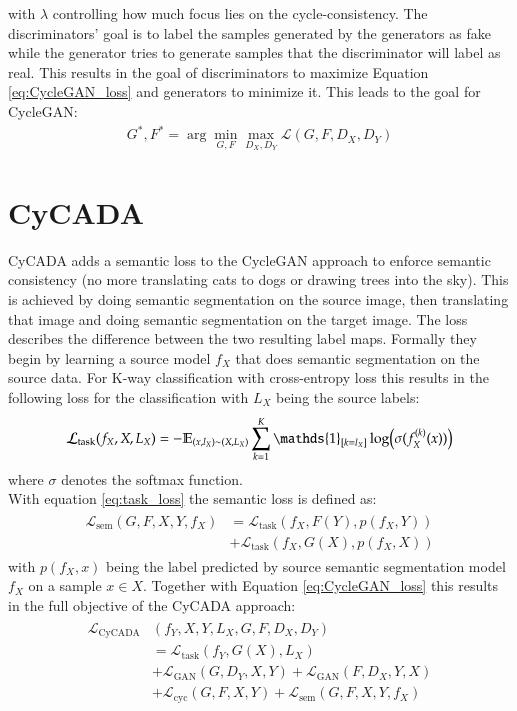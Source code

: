with $\lambda$ controlling how much focus lies on the cycle-consistency. The discriminators' goal is to label the samples generated by the generators as fake while the generator tries to generate samples that the discriminator will label as real. This results in the goal of discriminators to maximize Equation \ref{eq:CycleGAN_loss} and generators to minimize it. This leads to the goal for CycleGAN: 
\begin{align}
	G^*, F^* = \arg \underset{G,F}{\min}\underset{D_X, D_Y}{\max} \mathcal{L}(G,F,D_X,D_Y) \label{eq:GAN_goal}
\end{align}
\section{CyCADA} 
CyCADA \cite{DBLP:journals/corr/abs-1711-03213} adds a semantic loss to the CycleGAN approach to enforce semantic consistency (no more translating cats to dogs or drawing trees into the sky). This is achieved by doing semantic segmentation on the source image, then translating that image and doing semantic segmentation on the target image. The loss describes the difference between the two resulting label maps. Formally they begin by learning a source model $f_X$ that does semantic segmentation on the source data. For K-way classification with cross-entropy loss this results in the following loss for the classification with $L_X$ being the source labels:
\begin{align}
	\mathcal{L}_{\text{task}}(f_X, X, L_X) = -\mathbb{E}_{(x, l_X)\sim(X, L_X)}\sum_{k=1}^{K}\mathds{1}_{[k=l_X]}\log\Bigl(\sigma(f_X^{(k)}(x))\Bigr) \label{eq:task_loss} 
\end{align}
where $\sigma$ denotes the softmax function.\\
With equation \ref{eq:task_loss} the semantic loss is defined as:
\begin{align}
	\begin{split}
		\mathcal{L}_{\text{sem}}(G, F, X, Y, f_X) &= \mathcal{L}_{\text{task}}(f_X, F(Y), p(f_X, Y))\\
		&+ \mathcal{L}_{\text{task}}(f_X, G(X), p(f_X, X))
	\end{split}
\end{align}
with $p(f_X, x)$ being the label predicted by source semantic segmentation model $f_X$ on a sample $x \in X$. Together with Equation \ref{eq:CycleGAN_loss} this results in the full objective of the CyCADA approach:
\begin{align}
	\begin{split}
		\mathcal{L}_{\text{CyCADA}}&(f_Y, X, Y, L_X, G, F, D_X, D_Y)\\
		&= \mathcal{L}_{\text{task}}(f_Y, G(X), L_X)\\
		&+ \mathcal{L}_{\text{GAN}}(G, D_Y, X, Y) + \mathcal{L}_{\text{GAN}}(F, D_X, Y, X)\\
		&+ \mathcal{L}_{\text{cyc}}(G, F, X, Y) + \mathcal{L}_{\text{sem}}(G, F, X, Y, f_X)
	\end{split}
\end{align}
